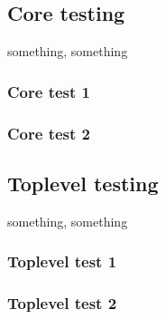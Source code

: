 \subsection{Core testing}
something, something

\subsubsection{Core test 1}

\subsubsection{Core test 2}

\subsection{Toplevel testing}
something, something

\subsubsection{Toplevel test 1}

\subsubsection{Toplevel test 2}
